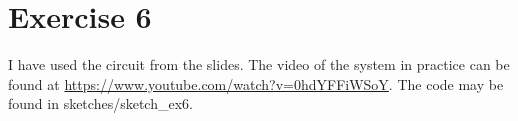\part*{Exercise 6} 
I have used the circuit from the slides. The video of the system in practice can be found at \url{https://www.youtube.com/watch?v=0hdYFFiWSoY}. The code may be found in sketches/sketch\_ex6.
